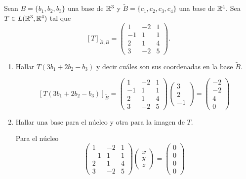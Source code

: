 \item Sean $B=\{b_1,b_2,b_3\}$ una base de $\mathbb{R}^3$ y $\tilde{B}=\{c_1,c_2,c_3,c_4\}$ una base de $\mathbb{R}^4$. Sea $T\in L(\mathbb{R}^3,\mathbb{R}^4)$ tal que\[[T]_{\tilde{B},B}=\begin{pmatrix}
        1&-2&1\\-1&1&1\\2&1&4\\3&-2&5
    \end{pmatrix}.\]
    \begin{enumerate}
        \item Hallar $T(3b_1+2b_2-b_3)$ y decir cuáles son sus coordenadas en la base $\tilde{B}$.
            \begin{mdframed}[style=s]
                \[[T(3b_1+2b_2-b_3)]_{\tilde{B}}=\begin{pmatrix}
                    1&-2&1\\-1&1&1\\2&1&4\\3&-2&5
                \end{pmatrix}\begin{pmatrix}
                    3\\2\\-1
                \end{pmatrix}=\begin{pmatrix}
                    -2\\-2\\4\\0
                \end{pmatrix}\]
            \end{mdframed}
        \item Hallar una base para el núcleo y otra para la imagen de $T$.
            \begin{mdframed}[style=s]
                Para el núcleo
                \[\begin{pmatrix}
                    1&-2&1\\-1&1&1\\2&1&4\\3&-2&5
                \end{pmatrix}\begin{pmatrix}
                    x\\y\\z
                \end{pmatrix}=\begin{pmatrix}
                    0\\0\\0\\0

\end{pmatrix}\]
\end{mdframed}
\end{enumerate}
